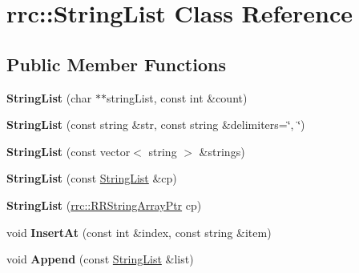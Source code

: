 \hypertarget{classrrc_1_1_string_list}{}\section{rrc\+:\+:String\+List Class Reference}
\label{classrrc_1_1_string_list}
\subsection*{Public Member Functions}
\begin{DoxyCompactItemize}
\item 
\hypertarget{classrrc_1_1_string_list_ae9224ec7dbf38c7ce031beb75e6e29bf}{}{\bfseries String\+List} (char $\ast$$\ast$string\+List, const int \&count)\label{classrrc_1_1_string_list_ae9224ec7dbf38c7ce031beb75e6e29bf}

\item 
\hypertarget{classrrc_1_1_string_list_aee4477df3cb127a8ea888edeabc0a17e}{}{\bfseries String\+List} (const string \&str, const string \&delimiters=\char`\"{}, \char`\"{})\label{classrrc_1_1_string_list_aee4477df3cb127a8ea888edeabc0a17e}

\item 
\hypertarget{classrrc_1_1_string_list_a6ec1b2091fe34e4b10a140a90c0527d8}{}{\bfseries String\+List} (const vector$<$ string $>$ \&strings)\label{classrrc_1_1_string_list_a6ec1b2091fe34e4b10a140a90c0527d8}

\item 
\hypertarget{classrrc_1_1_string_list_a36cdefed17e6a9c8b085202e7cc32b75}{}{\bfseries String\+List} (const \hyperlink{classrrc_1_1_string_list}{String\+List} \&cp)\label{classrrc_1_1_string_list_a36cdefed17e6a9c8b085202e7cc32b75}

\item 
\hypertarget{classrrc_1_1_string_list_ac9267de17c65e8049d1445cf414a0f20}{}{\bfseries String\+List} (\hyperlink{rrc__types_8h_a7c9475df6c7337d99482b13a365e7596}{rrc\+::\+R\+R\+String\+Array\+Ptr} cp)\label{classrrc_1_1_string_list_ac9267de17c65e8049d1445cf414a0f20}

\item 
\hypertarget{classrrc_1_1_string_list_abace2c802bdb1693828d75c33bf60226}{}void {\bfseries Insert\+At} (const int \&index, const string \&item)\label{classrrc_1_1_string_list_abace2c802bdb1693828d75c33bf60226}

\item 
\hypertarget{classrrc_1_1_string_list_ab0efc21ec5b7fe3073b9cd0f742fd6b2}{}void {\bfseries Append} (const \hyperlink{classrrc_1_1_string_list}{String\+List} \&list)\label{classrrc_1_1_string_list_ab0efc21ec5b7fe3073b9cd0f742fd6b2}


\end{DoxyCompactItemize}
